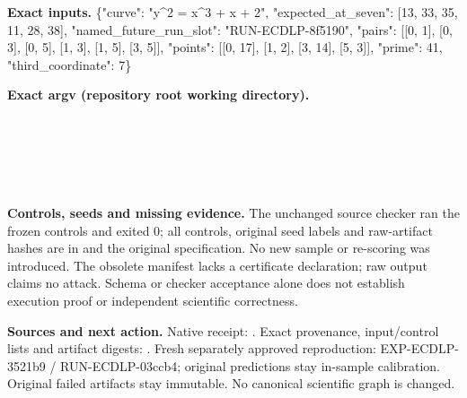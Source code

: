 \documentclass[10pt]{article}
\begin{document}
\textbf{Exact inputs.} \{"curve": "y\textasciicircum{}2 = x\textasciicircum{}3 + x + 2", "expected\_at\_seven": [13, 33, 35, 11, 28, 38], "named\_future\_run\_slot": "RUN-ECDLP-8f5190", "pairs": [[0, 1], [0, 3], [0, 5], [1, 3], [1, 5], [3, 5]], "points": [[0, 17], [1, 2], [3, 14], [5, 3]], "prime": 41, "third\_coordinate": 7\}

\textbf{Exact argv (repository root working directory).}\\
{\footnotesize {}\\
\\
\\
\\
\\
}

\textbf{Controls, seeds and missing evidence.} The unchanged source checker ran the frozen controls and exited 0; all controls, original seed labels and raw-artifact hashes are in  and the original specification. No new sample or re-scoring was introduced. The obsolete manifest lacks a certificate declaration; raw output claims no attack. Schema or checker acceptance alone does not establish execution proof or independent scientific correctness.

\textbf{Sources and next action.} Native receipt: . Exact provenance, input/control lists and artifact digests: . Fresh separately approved reproduction: EXP-ECDLP-3521b9 / RUN-ECDLP-03ccb4; original predictions stay in-sample calibration. Original failed artifacts stay immutable. No canonical scientific graph is changed.
\end{document}
